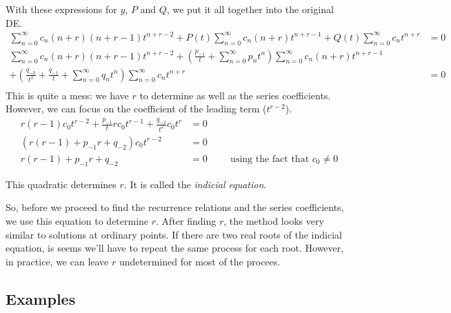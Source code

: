 \documentclass[fleqn,letterpaper]{report}
\begin{document}
With these expressions for $y$, $P$ and $Q$, we put it all
together into the original DE.
\begin{align*}
\sum_{n=0}^\infty c_n (n+r) (n+r-1) t^{n+r-2} 
+ P(t) \sum_{n=0}^\infty c_n (n+r) t^{n+r-1} 
+ Q(t) \sum_{n=0}^\infty c_n t^{n+r} & = 0 \\
\sum_{n=0}^\infty c_n (n+r) (n+r-1) t^{n+r-2} 
+ \left(\frac{p_{-1}}{t} + \sum_{n=0}^\infty p_n t^n \right) 
\sum_{n=0}^\infty c_n (n+r) t^{n+r-1} & \\
+ \left( \frac{q_{-2}}{t^2} + \frac{q_{-1}}{t} +
\sum_{n=0}^\infty q_n t^n \right) 
\sum_{n=0}^\infty c_n t^{n+r} & = 0 \\
\end{align*}
This is quite a mess: we have $r$ to determine as well as the
series coefficients. However, we can focus on the coefficient
of the leading term ($t^{r-2}$).
\begin{align*}
r(r-1) c_0 t^{r-2} + \frac{p_{-1}}{t} r c_0 t^{r-1} +
\frac{q_{-2}}{t^2} c_0 t^r & = 0 \\
(r(r-1) + p_{-1} r + q_{-2}) c_0 t^{r-2} & = 0 \\
r(r-1) + p_{-1}r + q_{-2} & = 0 \hspace{1cm} \text{using the
fact that } c_0 \neq 0
\end{align*}

\begin{defn}
This quadratic determines $r$. It is called
the \emph{indicial equation}. 
\end{defn}

So, before we proceed to find the recurrence relations and the
series coefficients, we use this equation to determine $r$.
After finding $r$, the method looks very similar to solutions
at ordinary points. If there are two real roots of the
indicial equation, is seems we'll have to repeat the same
process for each root.  However, in practice, we can leave
$r$ undetermined for most of the procees.

\subsection{Examples}
\label{frobenius-examples}
\end{document}
